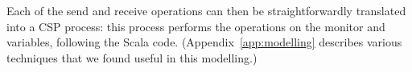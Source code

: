 




Each of the send and receive operations can then be straightforwardly
translated into a CSP process: this process performs the operations on the
monitor and variables, following the Scala code.
(Appendix~\ref{app:modelling} describes various techniques that we found
useful in this modelling.)  

